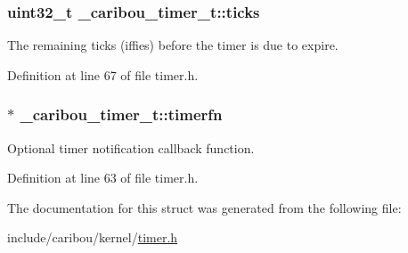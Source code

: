 \hypertarget{struct__caribou__timer__t_a94c03a7c23a27aa378b861389b6ee0c8}{
\subsubsection[{ticks}]{\setlength{\rightskip}{0pt plus 5cm}uint32\-\_\-t \-\_\-caribou\-\_\-timer\-\_\-t\-::ticks}}\label{struct__caribou__timer__t_a94c03a7c23a27aa378b861389b6ee0c8}


The remaining ticks (iffies) before the timer is due to expire. 



Definition at line 67 of file timer.\-h.

\hypertarget{struct__caribou__timer__t_a036d01df45a585775dd0ef585f90eb7a}{
\subsubsection[{timerfn}]{$\ast$ \-\_\-caribou\-\_\-timer\-\_\-t\-::timerfn}}\label{struct__caribou__timer__t_a036d01df45a585775dd0ef585f90eb7a}


Optional timer notification callback function. 



Definition at line 63 of file timer.\-h.



The documentation for this struct was generated from the following file\-:\begin{DoxyCompactItemize}
\item 
include/caribou/kernel/\hyperlink{timer_8h}{timer.\-h}\end{DoxyCompactItemize}
